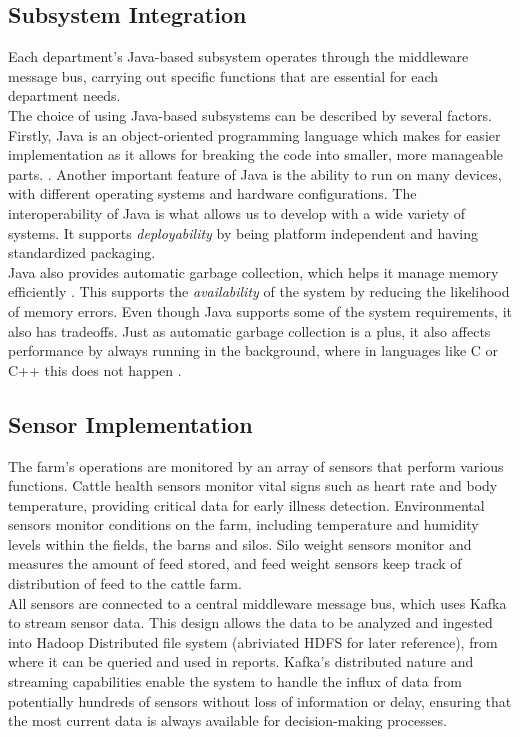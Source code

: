 \subsection{\textbf{Subsystem Integration}}
Each department's Java-based subsystem operates through the middleware message bus, carrying out specific functions that are essential for each department needs. \vspace{2mm}\\
The choice of using Java-based subsystems can be described by several factors. Firstly, Java is an object-oriented programming language which makes for easier implementation as it allows for breaking the code into smaller, more manageable parts. \cite{Team_2022}.
Another important feature of Java is the ability to run on many devices, with different operating systems and hardware configurations. The interoperability of Java is what allows us to develop with a wide variety of systems. It supports \textit{deployability} by being platform independent and having standardized packaging. \vspace{2mm} \\
Java also provides automatic garbage collection, which helps it manage memory efficiently \cite{Team_2022}. This supports the \textit{availability} of the system by reducing the likelihood of memory errors.
Even though Java supports some of the system requirements, it also has tradeoffs. Just as automatic garbage collection is a plus, it also affects performance by always running in the background, where in languages like C or C++ this does not happen \cite{Team_2022}. \vspace{1mm}

\subsection{\textbf{Sensor Implementation}}
The farm’s operations are monitored by an array of sensors that perform various functions. Cattle health sensors monitor vital signs such as heart rate and body temperature, providing critical data for early illness detection. Environmental sensors monitor conditions on the farm, including temperature and humidity levels within the fields, the barns and silos. Silo weight sensors monitor and measures the amount of feed stored, and feed weight sensors keep track of distribution of feed to the cattle farm. \vspace{2mm} \\
All sensors are connected to a central middleware message bus, which uses Kafka to stream sensor data. This design allows the data to be analyzed and ingested into Hadoop Distributed file system (abriviated HDFS for later reference), from where it can be queried and used in reports. Kafka’s distributed nature and streaming capabilities enable the system to handle the influx of data from potentially hundreds of sensors without loss of information or delay, ensuring that the most current data is always available for decision-making processes. \vspace{2mm}

